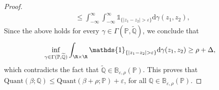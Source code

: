\documentclass[11pt,a4paper]{article}
\begin{document}
\begin{proof}
\begin{align*}
    &\leq\int_{-\infty}^\infty\int_{-\infty}^\infty \mathds{1}_{\{|z_1-z_2|> \varepsilon\}} \mathrm{d}\gamma(z_1,z_2),
\end{align*}
Since the above holds for every $\gamma\in\Gamma(\mathbb P, \widetilde{\mathbb Q})$, we conclude that
\begin{align*}
    \inf_{\gamma\in\Gamma(\mathbb P, \widetilde{\mathbb Q}
    )}\int_{\R\times\R} \mathds{1}_{\{|z_1-z_2|> \varepsilon\}} \mathrm{d}\gamma(z_1,z_2) \geq  \rho+\Delta,
\end{align*}
which contradicts the fact that $\widetilde{\mathbb Q} \in \mathbb{B}_{\varepsilon, \rho}(\mathbb P)$. This proves that $\text{Quant}(\beta;\mathbb Q) \leq \text{Quant}(\beta+\rho; \mathbb P) + \varepsilon$, for all $\mathbb Q \in \mathbb{B}_{\varepsilon, \rho}(\mathbb P)$.

\medskip


\end{proof}
\end{document}
